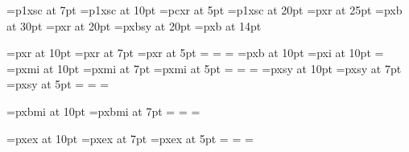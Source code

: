 %
%
\font\Citazioni=p1xsc at 7pt
\font\WWW=p1xsc at 10pt
\font\VecchioStile=pcxr at 5pt %
\font\Fronte=p1xsc at 20pt
\font\titoloCap=pxr at 25pt
\font\titoloCapUno=pxb at 30pt
\font\titoloSec=pxr at 20pt
\font\titoloSymbolSec=pxbsy at 20pt
\font\SottoSezioneFont=pxb at 14pt

\def\Text{pxr }
\font\PalatinoTextTen=\Text at 10pt
\font\PalatinoTextSeven=\Text at 7pt
\font\PalatinoTextFive=\Text at 5pt
=\PalatinoTextTen
{}=\PalatinoTextSeven
{}=\PalatinoTextFive 
\def\rm{\fam0\PalatinoTextTen}%
\def\Bold{pxb }
\font\PalatinoBold=\Bold at 10pt
\def\bf{\fam\bffam\PalatinoBold}
\def\pal{\rm \baselineskip=12.5pt}
\def\It{pxi }
\def\Italic{\PalatinoItalicTen}
\font\PalatinoItalicTen=\It at 10pt
\textfont\itfam=\PalatinoItalicTen
\def\it{\fam\itfam\PalatinoItalicTen}
\def\Math{pxmi }
\font\PalatinoMathTen=\Math     at 10pt
\font\PalatinoMathSeven=\Math   at 7pt
\font\PalatinoMathFive=\Math    at 5pt
=\PalatinoMathTen
{}=\PalatinoMathSeven
{}=\PalatinoMathFive
\def\MathSymbol{pxsy } 
\font\PalatinoMathSymbolTen=\MathSymbol at 10pt
\font\PalatinoMathSymbolSeven=\MathSymbol at 7pt
\font\PalatinoMathSymbolFive=\MathSymbol at 5pt
=\PalatinoMathSymbolTen
{}=\PalatinoMathSymbolSeven
{}=\PalatinoMathSymbolFive


\font\PalatinoMathBold=pxbmi at 10pt
\font\PalatinoMathBoldSeven=pxbmi at 7pt
\textfont\bffam=\PalatinoMathBold
\scriptfont\bffam=\PalatinoMathBoldSeven 
\scriptscriptfont\bffam=\PalatinoMathBold %

\def\MathMoreSymbol{pxex } 
\font\PalatinoMathMoreSymbolTen=\MathMoreSymbol at 10pt
\font\PalatinoMathMoreSymbolSeven=\MathMoreSymbol at 7pt
\font\PalatinoMathMoreSymbolFive=\MathMoreSymbol at 5pt
=\PalatinoMathMoreSymbolTen
{}=\PalatinoMathMoreSymbolSeven
{}=\PalatinoMathMoreSymbolFive

